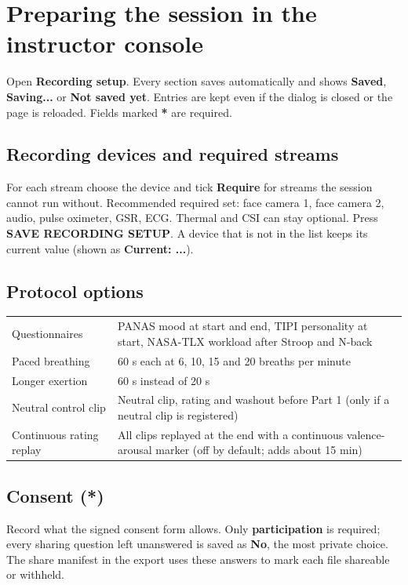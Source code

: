 \documentclass[11pt,a4paper]{article}
\newcommand{\ui}[1]{\textsf{\textbf{#1}}}
\begin{document}
\section{Preparing the session in the instructor console}

Open \ui{Recording setup}. Every section saves automatically and shows \ui{Saved}, \ui{Saving...} or
\ui{Not saved yet}. Entries are kept even if the dialog is closed or the page is reloaded. Fields marked
\textbf{*} are required.

\subsection{Recording devices and required streams}
For each stream choose the device and tick \ui{Require} for streams the session cannot run without. Recommended
required set: face camera 1, face camera 2, audio, pulse oximeter, GSR, ECG. Thermal and CSI can stay optional.
Press \ui{SAVE RECORDING SETUP}. A device that is not in the list keeps its current value (shown as
\ui{Current: ...}).

\subsection{Protocol options}
\begin{tabularx}{\linewidth}{@{}lX@{}}
\toprule
Questionnaires & PANAS mood at start and end, TIPI personality at start, NASA-TLX workload after Stroop and N-back \\
Paced breathing & 60 s each at 6, 10, 15 and 20 breaths per minute \\
Longer exertion & 60 s instead of 20 s \\
Neutral control clip & Neutral clip, rating and washout before Part 1 (only if a neutral clip is registered) \\
Continuous rating replay & All clips replayed at the end with a continuous valence-arousal marker (off by default; adds about 15 min) \\
\bottomrule
\end{tabularx}

\subsection{Consent (*)}
Record what the signed consent form allows. Only \textbf{participation} is required; every sharing question left
unanswered is saved as \textbf{No}, the most private choice. The share manifest in the export uses these answers to
mark each file shareable or withheld.
\end{document}
